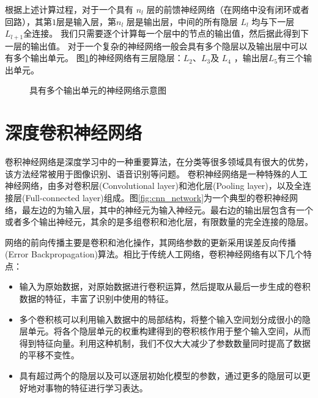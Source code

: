 





根据上述计算过程，对于一个具有 $n_l$ 层的前馈神经网络（在网络中没有闭环或者回路），其第$   1 $层是输入层，第$n_l$ 层是输出层，中间的所有隐层 $L_l$ 均与下一层 $L_{l+1}$全连接。
我们只需要逐个计算每一个层中的节点的输出值，然后据此得到下一层的输出值。
对于一个复杂的神经网络一般会具有多个隐层以及输出层中可以有多个输出单元。
图\ref{fig:network2}的神经网络有三层隐层：$  L_2 $、$ L_3$及 $ L_4$ ，输出层$  L_5 $有三个输出单元。

\begin{figure}
  \centering
  \sWuhao
  
  \caption{具有多个输出单元的神经网络示意图}
  \label{fig:network2}
\end{figure}

\section{深度卷积神经网络}

卷积神经网络是深度学习中的一种重要算法，在分类等很多领域具有很大的优势，该方法经常被用于图像识别、语音识别等问题。
卷积神经网络是一种特殊的人工神经网络，由多对卷积层(Convolutional layer)和池化层(Pooling layer)，以及全连接层(Full-connected layer)组成。图\ref{fig:cnn_network}为一个典型的卷积神经网络，最左边的为输入层，其中的神经元为输入神经元。最右边的输出层包含有一个或者多个输出神经元，其余的是多组卷积和池化层，有限数量的完全连接的隐层。

网络的前向传播主要是卷积和池化操作，其网络参数的更新采用误差反向传播(Error Backpropagation)算法。相比于传统人工网络，卷积神经网络有以下几个特点：
\begin{itemize}
  \item 输入为原始数据，对原始数据进行卷积运算，然后提取从最后一步生成的卷积数据的特征，丰富了识别中使用的特征。
  \item 多个卷积核可以利用输入数据中的局部结构，将整个输入空间划分成很小的隐层单元。将各个隐层单元的权重构建得到的卷积核作用于整个输入空间，从而得到特征向量。利用这种机制，我们不仅大大减少了参数数量同时提高了数据的平移不变性。
  \item 具有超过两个的隐层以及可以逐层初始化模型的参数，通过更多的隐层可以更好地对事物的特征进行学习表达。
\end{itemize}

